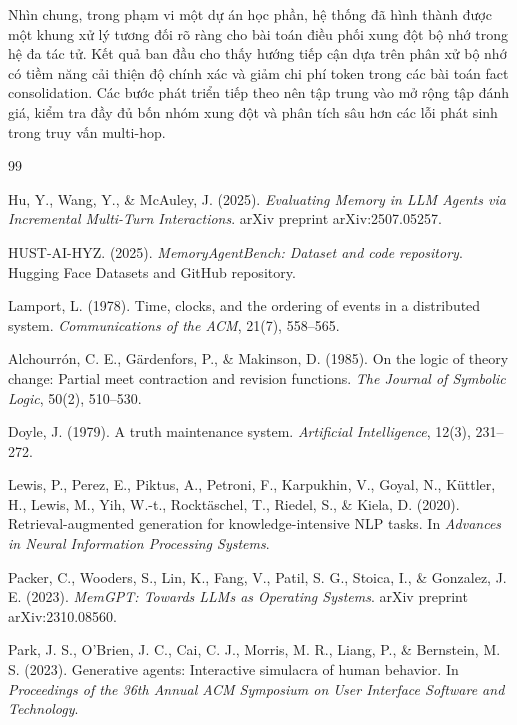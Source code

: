 \documentclass[12pt,a4paper]{article}
\begin{document}
Nhìn chung, trong phạm vi một dự án học phần, hệ thống đã hình thành được một khung xử lý tương đối rõ ràng cho bài toán điều phối xung đột bộ nhớ trong hệ đa tác tử. Kết quả ban đầu cho thấy hướng tiếp cận dựa trên phân xử bộ nhớ có tiềm năng cải thiện độ chính xác và giảm chi phí token trong các bài toán fact consolidation. Các bước phát triển tiếp theo nên tập trung vào mở rộng tập đánh giá, kiểm tra đầy đủ bốn nhóm xung đột và phân tích sâu hơn các lỗi phát sinh trong truy vấn multi-hop.


\newpage
{}
{}

\begin{thebibliography}{99}

Hu, Y., Wang, Y., \& McAuley, J. (2025).
\textit{Evaluating Memory in LLM Agents via Incremental Multi-Turn Interactions}.
arXiv preprint arXiv:2507.05257.

HUST-AI-HYZ. (2025).
\textit{MemoryAgentBench: Dataset and code repository}.
Hugging Face Datasets and GitHub repository.

Lamport, L. (1978).
Time, clocks, and the ordering of events in a distributed system.
\textit{Communications of the ACM}, 21(7), 558--565.

Alchourrón, C. E., Gärdenfors, P., \& Makinson, D. (1985).
On the logic of theory change: Partial meet contraction and revision functions.
\textit{The Journal of Symbolic Logic}, 50(2), 510--530.

Doyle, J. (1979).
A truth maintenance system.
\textit{Artificial Intelligence}, 12(3), 231--272.

Lewis, P., Perez, E., Piktus, A., Petroni, F., Karpukhin, V., Goyal, N.,
Küttler, H., Lewis, M., Yih, W.-t., Rocktäschel, T., Riedel, S., \& Kiela, D. (2020).
Retrieval-augmented generation for knowledge-intensive NLP tasks.
In \textit{Advances in Neural Information Processing Systems}.

Packer, C., Wooders, S., Lin, K., Fang, V., Patil, S. G., Stoica, I.,
\& Gonzalez, J. E. (2023).
\textit{MemGPT: Towards LLMs as Operating Systems}.
arXiv preprint arXiv:2310.08560.

Park, J. S., O'Brien, J. C., Cai, C. J., Morris, M. R., Liang, P.,
\& Bernstein, M. S. (2023).
Generative agents: Interactive simulacra of human behavior.
In \textit{Proceedings of the 36th Annual ACM Symposium on User Interface Software and Technology}.


\end{thebibliography}
\end{document}
